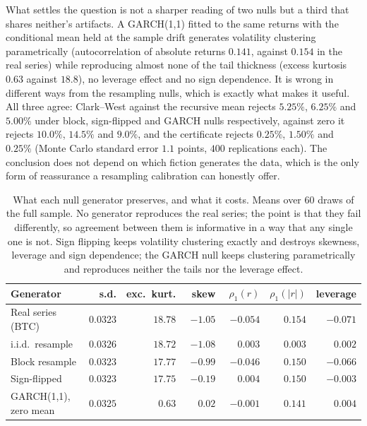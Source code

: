 \documentclass{article}
\theoremstyle{plain}
\theoremstyle{definition}
\begin{document}
What settles the question is not a sharper reading of two nulls but a third that shares
neither's artifacts. A GARCH(1,1) fitted to the same returns with the conditional mean held
at the sample drift generates volatility clustering parametrically (autocorrelation of
absolute returns $0.141$, against $0.154$ in the real series) while reproducing almost none of
the tail thickness (excess kurtosis $0.63$ against $18.8$), no leverage effect and no sign
dependence. It is wrong in different ways from the resampling nulls, which is exactly what
makes it useful. All three agree: Clark--West against the recursive mean rejects $5.25\%$,
$6.25\%$ and $5.00\%$ under block, sign-flipped and GARCH nulls respectively, against zero it
rejects $10.0\%$, $14.5\%$ and $9.0\%$, and the certificate rejects $0.25\%$, $1.50\%$ and
$0.25\%$ (Monte Carlo standard error $1.1$ points, $400$ replications each). The conclusion
does not depend on which fiction generates the data, which is the only form of reassurance a
resampling calibration can honestly offer.

\begin{table}[t]
  \centering
  \caption{What each null generator preserves, and what it costs. Means over 60 draws of the
  full sample. No generator reproduces the real series; the point is that they fail
  differently, so agreement between them is informative in a way that any single one is not.
  Sign flipping keeps volatility clustering exactly and destroys skewness, leverage and sign
  dependence; the GARCH null keeps clustering parametrically and reproduces neither the tails
  nor the leverage effect.}
  \label{tab:nulls}
  \small
  \setlength{\tabcolsep}{4pt}
  \begin{tabular}{lrrrrrr}
    \toprule
    Generator & s.d. & exc.\ kurt. & skew & $\rho_1(r)$ & $\rho_1(|r|)$ & leverage \\
    \midrule
    Real series (BTC)      & $0.0323$ & $18.78$ & $-1.05$ & $-0.054$ & $0.154$ & $-0.071$ \\
    i.i.d.\ resample       & $0.0326$ & $18.72$ & $-1.08$ & $\phantom{-}0.003$ & $0.003$ & $\phantom{-}0.002$ \\
    Block resample         & $0.0323$ & $17.77$ & $-0.99$ & $-0.046$ & $0.150$ & $-0.066$ \\
    Sign-flipped           & $0.0323$ & $17.75$ & $-0.19$ & $\phantom{-}0.004$ & $0.150$ & $-0.003$ \\
    GARCH(1,1), zero mean  & $0.0325$ & $\phantom{0}0.63$ & $\phantom{-}0.02$ & $-0.001$ & $0.141$ & $\phantom{-}0.004$ \\
    \bottomrule
  \end{tabular}
\end{table}
\end{document}
